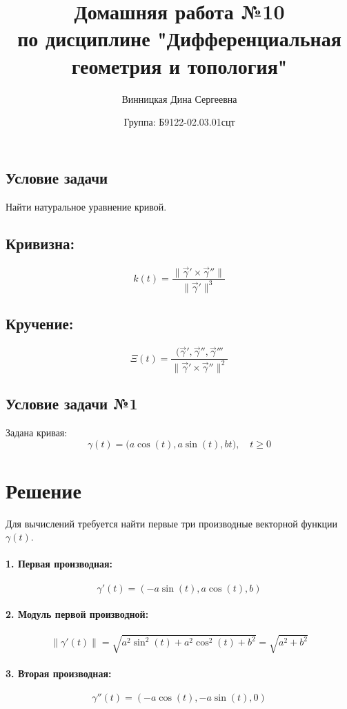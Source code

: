 \documentclass{article}
\title{\vspace{-1cm}Домашняя работа №10 \\ по дисциплине "Дифференциальная геометрия и топология"}
\author{Винницкая Дина Сергеевна}
\date{Группа: Б9122-02.03.01сцт}
\begin{document}
	
	\maketitle


        \subsection*{Условие задачи}
        
        Найти натуральное уравнение кривой.
        
        \subsection*{Кривизна:}
        \[
        k(t) = \frac{\|\vec{\gamma}' \times \vec{\gamma}''\|}{\|\vec{\gamma}'\|^3}
        \]
        
        \subsection*{Кручение:}
        \[
        \Xi(t) = \frac{(\vec{\gamma}', \vec{\gamma}'', \vec{\gamma}'''}{\|\vec{\gamma}' \times \vec{\gamma}''\|^2}
        \]

        \subsection*{Условие задачи №1}
        Задана кривая:
        \[
        \gamma(t) = \big(a \cos(t), a \sin(t), bt\big), \quad t \geq 0
        \]
        
        \section*{Решение}
       Для вычислений требуется найти первые три производные векторной функции \(\gamma(t)\).

        \paragraph{1. Первая производная:}
        \[
        \gamma'(t) = (-a \sin(t), a \cos(t), b)
        \]
        \paragraph{2. Модуль первой производной:}
        \[
        \|\gamma'(t)\| = \sqrt{a^2 \sin^2(t) + a^2 \cos^2(t) + b^2} = \sqrt{a^2 + b^2}
        \]
        
        \paragraph{3. Вторая производная:}
        \[
        \gamma''(t) = (-a \cos(t), -a \sin(t), 0)
        \]
        
\end{document}
